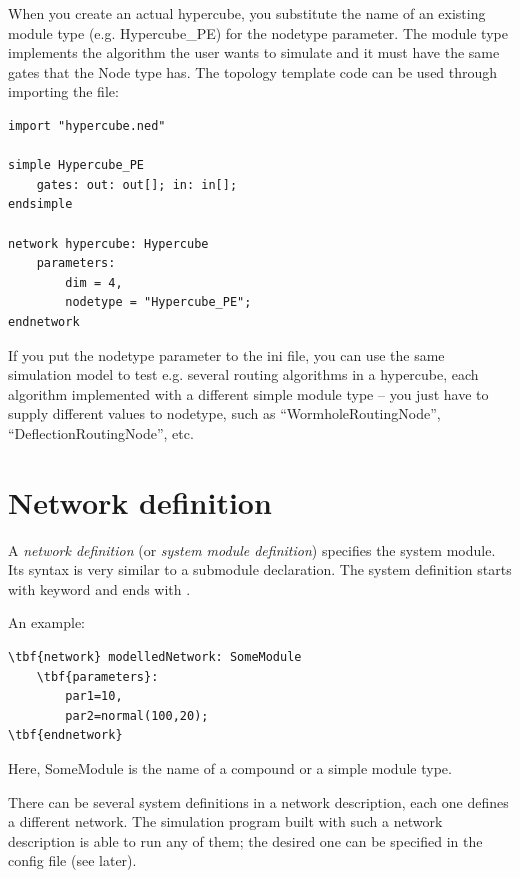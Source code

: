 When you create an actual hypercube, you substitute the name
of an existing module type (e.g. Hypercube\_PE) for the nodetype
parameter. The module type implements the algorithm the user
wants to simulate and it must have the same gates that the Node
type has. The topology template code can be used through importing
the file:


\begin{Verbatim}[commandchars=\\\{\}]
import "hypercube.ned"

simple Hypercube_PE
    gates: out: out[]; in: in[];
endsimple

network hypercube: Hypercube
    parameters:
        dim = 4,
        nodetype = "Hypercube_PE";
endnetwork
\end{Verbatim}



If you put the nodetype parameter to the ini file, you can use the
same simulation model to test e.g. several routing algorithms in a
hypercube, each algorithm implemented with a different
simple module type -- you just have to supply
different values to nodetype, such as ``WormholeRoutingNode'',
``DeflectionRoutingNode'', etc.





\section{Network definition}


A \textit{network definition} (or \textit{system module
  definition}) specifies the system module. Its syntax is very
similar to a submodule declaration. The system definition starts with
keyword  and ends with
.


An example:


\begin{Verbatim}[commandchars=\\\{\}]
\tbf{network} modelledNetwork: SomeModule
    \tbf{parameters}:
        par1=10,
        par2=normal(100,20);
\tbf{endnetwork}
\end{Verbatim}


Here, SomeModule is the name of a compound or a simple module type.


There can be several system definitions in a network description,
each one defines a different network. The simulation program
built with such a network description is able to run any of them;
the desired one can be specified in the config file (see later).





